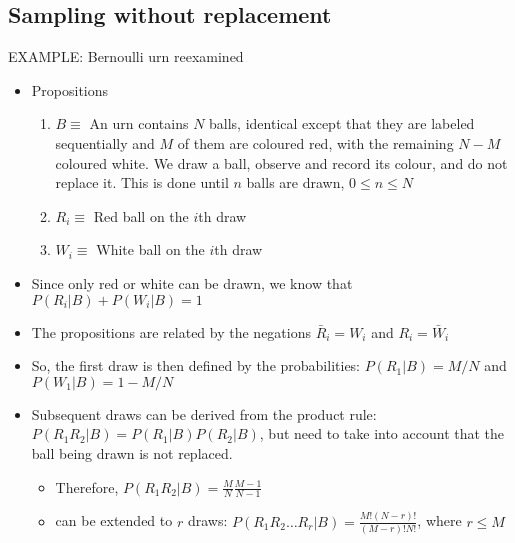 \documentclass[../jaynes_prob_theory_notes.tex]{subfiles}
\begin{document}
\subsection{Sampling without replacement}
    EXAMPLE: Bernoulli urn reexamined
        \begin{itemize}
            \item Propositions
                \begin{enumerate}
                    \item $B \equiv$ An urn contains $N$ balls, identical except that they are labeled sequentially and $M$ of them are coloured red, with the remaining $N-M$ coloured white. We draw a ball, observe and record its colour, and do not replace it. This is done until $n$ balls are drawn, $0 \leq n \leq N$
                    \item $R_i \equiv$ Red ball on the $i$th draw
                    \item $W_i \equiv$ White ball on the $i$th draw
                \end{enumerate}
        
            \item Since only red or white can be drawn, we know that $P(R_i|B) + P(W_i|B) = 1$
            \item The propositions are related by the negations $\bar{R}_i = W_i$ and $R_i = \bar{W}_i$
            \item So, the first draw is then defined by the probabilities: $P(R_1|B) = M/N$ and $P(W_1|B) = 1 - M/N$
            \item Subsequent draws can be derived from the product rule: $P(R_1R_2|B) = P(R_1|B)P(R_2|B)$, but need to take into account that the ball being drawn is not replaced. 
                \begin{itemize}
                    \item Therefore, $P(R_1R_2|B) = \frac{M}{N}\frac{M-1}{N-1}$
                    \item can be extended to $r$ draws: $P(R_1R_2 \ldots R_r|B) = \frac{M!(N-r)!}{(M-r)!N!}$, where $r \leq M$ 
                \end{itemize}
        

\end{itemize}
\end{document}

